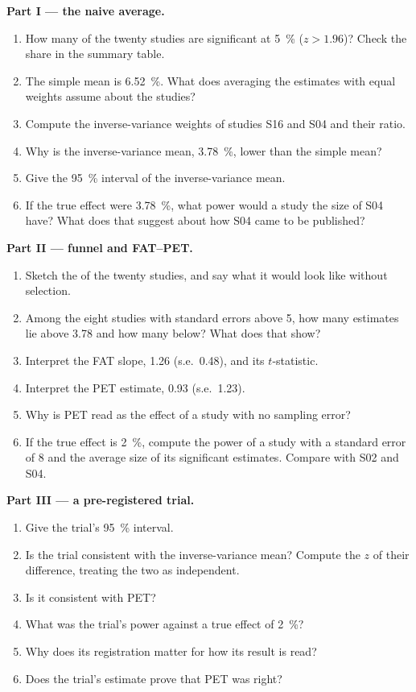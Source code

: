 \begin{problem}
\medskip\noindent\textbf{Part I --- the naive average.}
\begin{enumerate}
\item How many of the twenty studies are significant at 5~\% ($z > 1.96$)? Check
the share in the summary table.
\item The simple mean is 6.52~\%. What does averaging the estimates with equal
weights assume about the studies?
\item Compute the inverse-variance weights of studies S16 and S04 and their
ratio.
\item Why is the inverse-variance mean, 3.78~\%, lower than the simple mean?
\item Give the 95~\% interval of the inverse-variance mean.
\item If the true effect were 3.78~\%, what power would a study the size of S04
have? What does that suggest about how S04 came to be published?
\end{enumerate}

\medskip\noindent\textbf{Part II --- funnel and FAT--PET.}
\begin{enumerate}[resume]
\item Sketch the  of the twenty studies, and say what it would look
like without selection.
\item Among the eight studies with standard errors above 5, how many estimates
lie above 3.78 and how many below? What does that show?
\item Interpret the FAT slope, 1.26 (s.e.\ 0.48), and its $t$-statistic.
\item Interpret the PET estimate, 0.93 (s.e.\ 1.23).
\item Why is PET read as the effect of a study with no sampling error?
\item If the true effect is 2~\%, compute the power of a study with a standard
error of 8 and the average size of its significant estimates. Compare with S02
and S04.
\end{enumerate}

\medskip\noindent\textbf{Part III --- a pre-registered trial.}
\begin{enumerate}[resume]
\item Give the trial's 95~\% interval.
\item Is the trial consistent with the inverse-variance mean? Compute the $z$
of their difference, treating the two as independent.
\item Is it consistent with PET?
\item What was the trial's power against a true effect of 2~\%?
\item Why does its registration matter for how its result is read?
\item Does the trial's estimate prove that PET was right?
\end{enumerate}


\end{problem}
